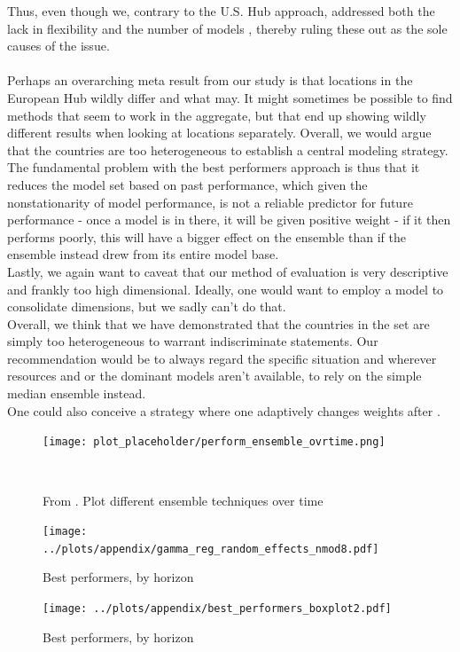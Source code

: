 Thus, even though we, contrary to the U.S. Hub approach, addressed both the lack in flexibility and the number of models , thereby ruling these out as the sole causes of the issue.\\\\
Perhaps an overarching meta result from our study is that locations in the European Hub wildly differ and what may. It might sometimes be possible to find methods that seem to work in the aggregate, but that end up showing wildly different results when looking at locations separately. Overall, we would argue that the countries are too heterogeneous to establish a central modeling strategy.\\
The fundamental problem with the best performers approach is thus that it reduces the model set based on past performance, which given the nonstationarity of model performance, is not a reliable predictor for future performance - once a model is in there, it will be given positive weight - if it then performs poorly, this will have a bigger effect on the ensemble than if the ensemble instead drew from its entire model base.\\
Lastly, we again want to caveat that our method of evaluation is very descriptive and frankly too high dimensional. Ideally, one would want to employ a model to consolidate dimensions, but we sadly can't do that. \\
Overall, we think that we have demonstrated that the countries in the set are simply too heterogeneous to warrant indiscriminate statements. Our recommendation would be to always regard the specific situation and wherever resources and or the dominant models aren't available, to rely on the simple median ensemble instead.\\
One could also conceive a strategy where one adaptively changes weights after .\\
\begin{figure}
\centering
\texttt{[image: plot\_placeholder/perform\_ensemble\_ovrtime.png]}
\caption{From \cite{ray_ensemble_2020}. Plot different ensemble techniques over time}
\
\end{figure}



\appendix


\begin{figure}
\centering
\texttt{[image: ../plots/appendix/gamma\_reg\_random\_effects\_nmod8.pdf]}
\caption{Best performers, by horizon}
\label{fig:replot_nmod8}
\end{figure}

\begin{figure}
\centering
\texttt{[image: ../plots/appendix/best\_performers\_boxplot2.pdf]}
\caption{Best performers, by horizon}
\label{fig:best_performers_by_horizon}
\end{figure}


